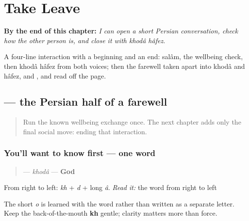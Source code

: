 
\chapter{Take Leave}
\label{ch:fa-take-leave}

\begin{chapteropening}
\textbf{By the end of this chapter:} \emph{I can open a short Persian conversation, check how the other person is, and close it with khodâ hâfez.}

A four-line interaction with a beginning and an end: salâm, the wellbeing check, then khodâ hâfez from both voices; then the farewell taken apart into khodâ and hâfez, and ,  and  read off the page.
\end{chapteropening}

\section[\texorpdfstring{\fa{خدا} (khodâ)}{خدا (khodâ)}]{ — the Persian half of a farewell}

\label{lesson:FA-C05-khoda}



\begin{quote}
Run the known wellbeing exchange once. The next chapter adds only the final social move: ending that interaction.
\end{quote}

\subsection*{You'll want to know first — one word}
\begin{quote}
\textbf{} — \emph{khodâ} — \textbf{God}
\end{quote}

From right to left: \textbf{} \emph{kh} + \textbf{} \emph{d} + \textbf{} long \emph{â}. \emph{Read it:} the word from right to left

The short \emph{o} is learned with the word rather than written as a separate letter. Keep the back-of-the-mouth \textbf{kh} gentle; clarity matters more than force.

